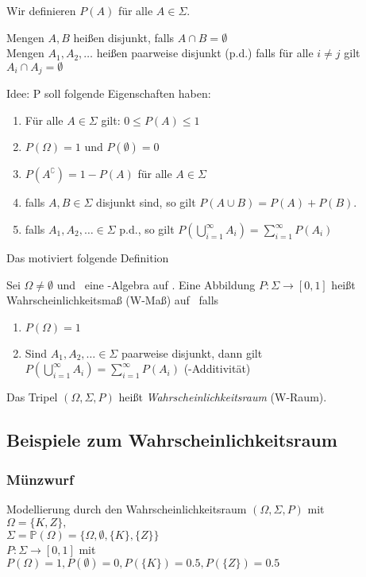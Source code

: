 Wir definieren $P(A)$ für alle $A \in \Sigma$.
\begin{definition}
    Mengen $A, B$ heißen disjunkt, falls $A\cap B = \emptyset$\\
    Mengen $A_1, A_2, \dots$ heißen paarweise disjunkt (p.d.) falls für alle $i \neq j$ gilt
    $A_i \cap A_j = \emptyset$
\end{definition}

Idee: P soll folgende Eigenschaften haben:
\begin{enumerate}
    \item Für alle $A\in \Sigma$ gilt: $0 \leq P(A)\leq 1$
    \item $P(\Omega) = 1$ und $P(\emptyset) = 0$
    \item $P(A^\complement) = 1-P(A)$ für alle $A\in \Sigma$
    \item falls $A,B\in\Sigma$ disjunkt sind, so gilt
        $P(A\cup B) = P(A) + P(B)$.
    \item falls $A_1, A_2,\dots \in \Sigma$ p.d., so gilt
        $P(\bigcup\limits_{i=1}^\infty A_i) = \sum_{i=1}^\infty P(A_i)$
\end{enumerate}

Das motiviert folgende Definition

\begin{definition}[Wahrscheinlichkeitsmaß]
    Sei $\Omega \neq \emptyset$ und \tS\ eine \ts-Algebra auf \tO.
    Eine Abbildung $P: \Sigma \to [0,1]$ heißt Wahrscheinlichkeitsmaß (W-Maß) auf \tS\ falls
    \begin{enumerate}
        \item $P(\Omega) = 1$
        \item Sind $A_1, A_2,\dots \in \Sigma$ paarweise disjunkt, dann gilt
            $P\left(\bigcup_{i=1}^\infty A_i\right) = \sum_{i=1}^\infty P(A_i)$
            (\ts-Additivität)
    \end{enumerate}
\end{definition}
\noindent
Das Tripel $\left( \Omega, \Sigma, P\right)$ heißt \emph{Wahrscheinlichkeitsraum} (W-Raum).

\subsection{Beispiele zum Wahrscheinlichkeitsraum}
\subsubsection{Münzwurf}
Modellierung durch den Wahrscheinlichkeitsraum $(\Omega, \Sigma, P)$ mit\\
$\Omega = \{K,Z\},$\\
$\Sigma = \mathbb{P}(\Omega) = \{ \Omega, \emptyset, \{K\}, \{Z\}\}$\\
$P: \Sigma \to [0,1]$ mit\\
$P(\Omega) = 1, P(\emptyset) = 0, P(\{K\}) = 0.5, P(\{Z\}) = 0.5$

